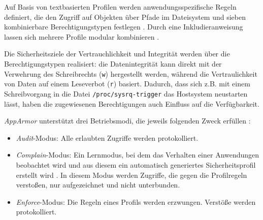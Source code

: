 \documentclass[../main.tex]{subfiles}
\begin{document}
				Auf Basis von textbasierten Profilen werden anwendungsspezifische Regeln definiert, die den Zugriff auf Objekten über Pfade im Dateisystem und sieben kombinierbare Berechtigungstypen festlegen \cite{linuxSecOverview}\cite{apparmorQuickProfileLanguage}. Durch eine Inkludieranweisung lassen sich mehrere Profile modular kombinieren \cite{apparmorQuickProfileLanguage}.

				Die Sicherheitsziele der Vertrauchlichkeit und Integrität werden über die Berechtigungstypen realisiert: die Datenintegrität kann direkt mit der Verwehrung des Schreibrechts (\texttt{w}) hergestellt werden, während die Vertraulichkeit von Daten auf einem Leseverbot (\texttt{r}) basiert. Dadurch, dass sich z.B. mit einem Schreibvorgang in die Datei \texttt{/proc/sysrq-trigger} das Hostsystem neustarten lässt, haben die zugewiesenen Berechtigungen auch Einfluss auf die Verfügbarkeit.


				\emph{AppArmor} unterstützt drei Betriebsmodi, die jeweils folgenden Zweck erfüllen \cite[S.82]{SELinuxApparmor}:
				\begin{itemize}
					\item \emph{Audit}-Modus: Alle erlaubten Zugriffe werden protokolliert.
					\item \emph{Complain}-Modus: Ein Lernmodus, bei dem das Verhalten einer Anwendungen beobachtet wird und aus diesem ein automatisch generiertes Sicherheitsprofil erstellt wird \cite{linuxSecOverview}. In diesem Modus werden Zugriffe, die gegen die Profilregeln verstoßen, nur aufgezeichnet und nicht unterbunden.
					\item \emph{Enforce}-Modus: Die Regeln eines Profils werden erzwungen. Verstöße werden protokolliert.
				\end{itemize}

\end{document}
